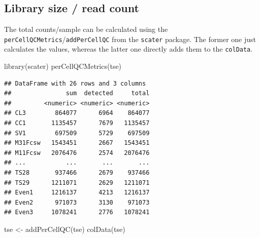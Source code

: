 \documentclass[
]{book}
\newenvironment{Shaded}{\begin{snugshade}}{\end{snugshade}}
\newcommand{\FunctionTok}[1]{\textcolor[rgb]{0.00,0.00,0.00}{#1}}
\newcommand{\NormalTok}[1]{#1}
\newcommand{\OtherTok}[1]{\textcolor[rgb]{0.56,0.35,0.01}{#1}}
\begin{document}
\hypertarget{library-size-read-count}{%
\subsection{Library size / read count}\label{library-size-read-count}}

The total counts/sample can be calculated using the
\texttt{perCellQCMetrics}/\texttt{addPerCellQC} from the \texttt{scater} package. The former one
just calculates the values, whereas the latter one directly adds them to the
\texttt{colData}.

\begin{Shaded}
\begin{Highlighting}[]
\FunctionTok{library}\NormalTok{(scater)}
\FunctionTok{perCellQCMetrics}\NormalTok{(tse)}
\end{Highlighting}
\end{Shaded}

\begin{verbatim}
## DataFrame with 26 rows and 3 columns
##               sum  detected     total
##         <numeric> <numeric> <numeric>
## CL3        864077      6964    864077
## CC1       1135457      7679   1135457
## SV1        697509      5729    697509
## M31Fcsw   1543451      2667   1543451
## M11Fcsw   2076476      2574   2076476
## ...           ...       ...       ...
## TS28       937466      2679    937466
## TS29      1211071      2629   1211071
## Even1     1216137      4213   1216137
## Even2      971073      3130    971073
## Even3     1078241      2776   1078241
\end{verbatim}

\begin{Shaded}
\begin{Highlighting}[]
\NormalTok{tse }\OtherTok{\textless{}{-}} \FunctionTok{addPerCellQC}\NormalTok{(tse)}
\FunctionTok{colData}\NormalTok{(tse)}
\end{Highlighting}
\end{Shaded}
\end{document}
